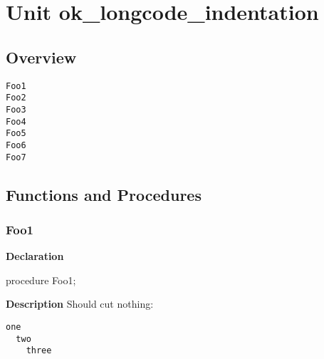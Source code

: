 \documentclass{report}
\begin{document}
\newlength{\tmplength}
\chapter{Unit ok{\_}longcode{\_}indentation}
\section{Overview}
\begin{description}
\item[\texttt{Foo1}]
\item[\texttt{Foo2}]
\item[\texttt{Foo3}]
\item[\texttt{Foo4}]
\item[\texttt{Foo5}]
\item[\texttt{Foo6}]
\item[\texttt{Foo7}]
\end{description}
\section{Functions and Procedures}
\subsection*{Foo1}
\begin{list}{}{
\setlength{\itemindent}{0cm}
\setlength{\listparindent}{0cm}
\setlength{\leftmargin}{\evensidemargin}
\addtolength{\leftmargin}{\tmplength}
\settowidth{\labelsep}{X}
\addtolength{\leftmargin}{\labelsep}
\setlength{\labelwidth}{\tmplength}
}
\begin{flushleft}
\item[\textbf{Declaration}\hfill]
\begin{ttfamily}
procedure Foo1;\end{ttfamily}


\end{flushleft}
\par
\item[\textbf{Description}]
Should cut nothing:

\texttt{one\\\nopagebreak[3]
~~two\\\nopagebreak[3]
~~~~three\\
}

\end{list}
\end{document}

